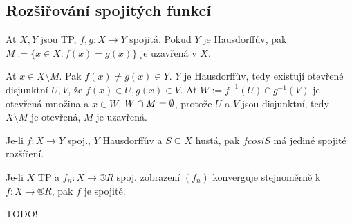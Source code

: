 \documentclass[12pt]{article}					%
\begin{document}
    \subsection{Rozšiřování spojitých funkcí}
        \begin{tvrzeni}
            Ať $X, Y$ jsou TP, $f, g: X \rightarrow Y$ spojitá. Pokud $Y$ je Hausdorffův, pak $M:=\{x\in X: f(x) = g(x)\}$ je uzavřená v $X$.

            \begin{dukazin}
                Ať $x \in X\setminus M$. Pak $f(x)≠g(x) \in Y$. $Y$ je Hausdorffův, tedy existují otevřené disjunktní $U, V$, že $f(x) \in U, g(x) \in V$. Ať $W := f^{-1}(U) \cap g^{-1}(V)$ je otevřená množina a $x \in W$. $W \cap M = \emptyset$, protože $U$ a $V$ jsou disjunktní, tedy $X \setminus M$ je otevřená, $M$ je uzavřená.
            \end{dukazin}
        \end{tvrzeni}

        \begin{poznamka}
            Je-li $f: X \rightarrow Y$ spoj., $Y$ Hausdorffův a $S \subseteq X$ hustá, pak $fcosiS$ má  jediné spojité rozšíření.
        \end{poznamka}

        \begin{tvrzeni}
            Je-li $X$ TP a $f_n: X \rightarrow ®R$ spoj. zobrazení $(f_n)$ konverguje stejnoměrně k $f: X \rightarrow ®R$, pak $f$ je spojité.

            \begin{dukazin}
                TODO!
            \end{dukazin}
        \end{tvrzeni}
\end{document}
